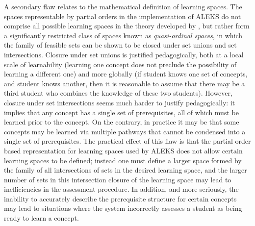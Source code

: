 \documentclass[11pt]{llncs}
\begin{document}
{A secondary flaw relates to the mathematical definition of learning spaces. The spaces representable by partial orders in the implementation of ALEKS do not comprise all possible learning spaces in the theory developed by \citet{doign99}, but rather form a significantly restricted class of spaces known as \emph{quasi-ordinal spaces}, in which the family of feasible sets can be shown to be closed under set unions and set intersections. Closure under set unions is justified pedagogically, both at a local scale of learnability (learning one concept does not preclude the possibility of learning a different one) and more globally (if student  knows one set of concepts, and student  knows another, then it is reasonable to assume that there may be a third student who combines the knowledge of these two students). However, closure under set intersections seems much harder to justify pedagogically: it implies that any concept has a single set of prerequisites, all of which must be learned prior to the concept. On the contrary, in practice it may be that some concepts may be learned via multiple pathways that cannot be condensed into a single set of prerequisites.  The practical effect of this flaw is that the partial order based representation for learning spaces used by ALEKS does not allow certain learning spaces to be defined; instead one must define a larger space formed by the family of all intersections of sets in the desired learning space, and the larger number of sets in this intersection closure of the learning space may lead to inefficiencies in the assessment procedure. In addition, and more seriously, the inability to accurately describe the prerequisite structure for certain concepts may lead to situations where the system incorrectly assesses a student as being ready to learn a concept.

}
\end{document}
